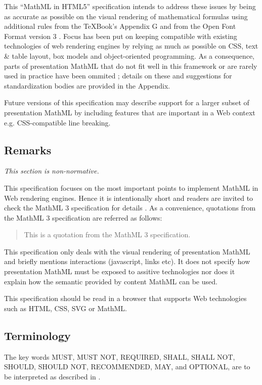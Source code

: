 This ``MathML in HTML5'' specification intends to address these issues by being
as accurate as
possible on the visual rendering of mathematical formulas using additional
rules from the \TeX Book's Appendix G \cite{TeXBook} and from
the Open Font Format version 3 \cite{OpenFontFormat3}.
Focus has been put on keeping compatible with existing technologies of web
rendering engines \cite{HTML5} by relying as much as possible on CSS, text \&
table layout, box models and object-oriented programming.
As a consequence, parts of presentation MathML
that do not fit well in this framework or are rarely used in practice
have been ommited ; details on these and suggestions for standardization bodies
are provided in the Appendix.

Future versions of this specification may describe support for a larger subset
of presentation MathML by including features that are important in a Web context
e.g. CSS-compatible line breaking.

\subsection{Remarks}

{\em This section is non-normative.}

This specification focuses on the most important points to implement
MathML in Web rendering engines. Hence it is intentionally short and readers are
invited to check the MathML 3 specification for details \cite{MathML3}.
As a convenience, quotations from the MathML 3 specification are referred as
follows:
\begin{quote}
This is a quotation from the MathML 3 specification.
\end{quote}

This specification only deals with the visual rendering of presentation MathML
and briefly mentions interactions (javascript, links etc). It does not specify
how presentation MathML must be exposed to assitive technologies nor does it
explain how the semantic provided by content MathML can be used.

This specification should be read in a browser that supports Web technologies
such as HTML, CSS, SVG or MathML.

\subsection{Terminology}

The key words MUST, MUST NOT, REQUIRED, SHALL, SHALL NOT, SHOULD, SHOULD NOT,
RECOMMENDED, MAY, and OPTIONAL, are to be interpreted as described in
\cite{IETF RFC 2119}.
